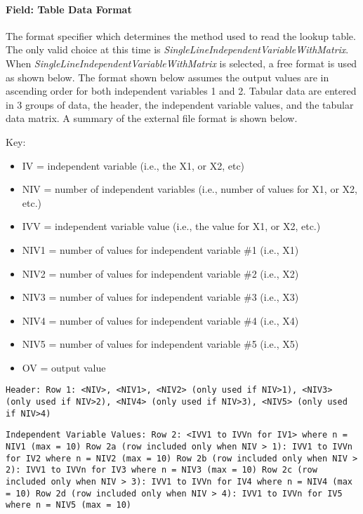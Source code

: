 \paragraph{Field: Table Data Format}\label{field-table-data-format}

The format specifier which determines the method used to read the lookup table. The only valid choice at this time is \emph{SingleLineIndependentVariableWithMatrix}. When \emph{SingleLineIndependentVariableWithMatrix} is selected, a free format is used as shown below. The format shown below assumes the output values are in ascending order for both independent variables 1 and 2. Tabular data are entered in 3 groups of data, the header, the independent variable values, and the tabular data matrix. A summary of the external file format is shown below.

Key:

\begin{itemize}
\item
  IV = independent variable (i.e., the X1, or X2, etc)
\item
  NIV = number of independent variables (i.e., number of values for X1, or X2, etc.)
\item
  IVV = independent variable value (i.e., the value for X1, or X2, etc.)
\item
  NIV1 = number of values for independent variable \#1 (i.e., X1)
\item
  NIV2 = number of values for independent variable \#2 (i.e., X2)
\item
  NIV3 = number of values for independent variable \#3 (i.e., X3)
\item
  NIV4 = number of values for independent variable \#4 (i.e., X4)
\item
  NIV5 = number of values for independent variable \#5 (i.e., X5)
\item
  OV = output value 
\end{itemize}

\begin{lstlisting}
Header: Row 1: <NIV>, <NIV1>, <NIV2> (only used if NIV>1), <NIV3> (only used if NIV>2), <NIV4> (only used if NIV>3), <NIV5> (only used if NIV>4)
\end{lstlisting}

\begin{lstlisting}
Independent Variable Values: Row 2: <IVV1 to IVVn for IV1> where n = NIV1 (max = 10) Row 2a (row included only when NIV > 1): IVV1 to IVVn for IV2 where n = NIV2 (max = 10) Row 2b (row included only when NIV > 2): IVV1 to IVVn for IV3 where n = NIV3 (max = 10) Row 2c (row included only when NIV > 3): IVV1 to IVVn for IV4 where n = NIV4 (max = 10) Row 2d (row included only when NIV > 4): IVV1 to IVVn for IV5 where n = NIV5 (max = 10)
\end{lstlisting}

